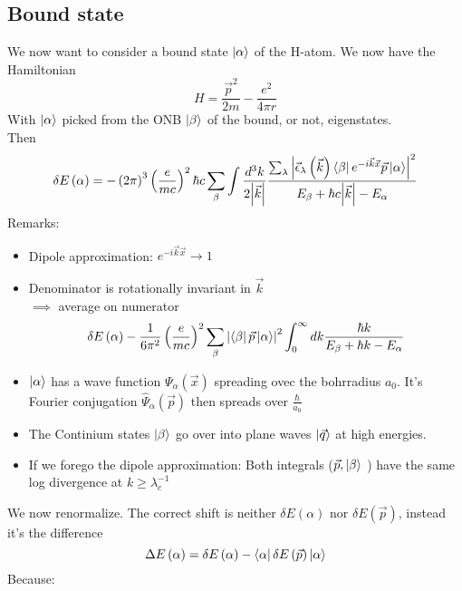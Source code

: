 \documentclass{report}
\begin{document}
\subsection{Bound state}
We now want to consider a bound state $\ket{\alpha}$ of the H-atom. We now have the Hamiltonian \[
H = \frac{\vec{p}^2}{2m} - \frac{e^2}{4\pi r}
\] With $\ket{\alpha} $ picked from the ONB $\ket{\beta}$ of the bound, or not, eigenstates.\\
Then \[
  \delta E\left( \alpha\right)  = -\left( 2\pi \right) ^{3} \left( \frac{e}{mc} \right) ^2 \hbar c \sum_{\beta}^{} \int \frac{d^{3}k}{2 \abs{\vec{k}}}  \frac{\sum_{\lambda}^{} \abs{ \vec{\epsilon}_{\lambda} \left( \vec{k} \right) \bra{\beta} e^{-i\vec{k}\vec{x}} \vec{p} \ket{\alpha}}^2}{E_{\beta} + \hbar c \abs{\vec{k}} - E_{\alpha}}
\] 
Remarks:
\begin{itemize}
  \item Dipole approximation: $e^{-i\vec{k}\vec{x}} \to 1$
  \item Denominator is rotationally invariant in $\vec{k}$ \\
    $\implies$ average on numerator \[
      \delta E\left( \alpha \right) - \frac{1}{6 \pi^2} \left( \frac{e}{mc} \right) ^2 \sum_{\beta}^{}  \abs{\bra{\beta} \vec{p} \ket{\alpha} }^2 \int_0^{\infty} dk \frac{\hbar k}{E_{\beta} + \hbar k - E_{\alpha}}
    \] 
  \item $\ket{\alpha}$ has a wave function $\Psi_\alpha\left( \vec{x} \right) $ spreading ovec the bohrradius $a_0$. It's Fourier conjugation $\hat{\Psi}_\alpha\left( \vec{p} \right) $ then spreads over $\frac{\hbar}{a_0}$
  \item The Continium states $\ket{\beta}$ go over into plane waves $\ket{\vec{q}}$ at high energies.
  \item If we forego the dipole approximation: Both integrals ($\vec{p}, \ket{\beta}$ ) have the same log divergence at $k \ge \lambda_c^{-1}$
\end{itemize}
We now renormalize. The correct shift is neither $\delta E\left( \alpha \right) $ nor $\delta E\left( \vec{p} \right) $, instead it's the difference \[
  \Delta E\left( \alpha \right) = \delta E\left( \alpha \right) - \bra{\alpha} \delta E\left( \vec{p} \right) \ket{\alpha}
\] 
Because:
\end{document}
